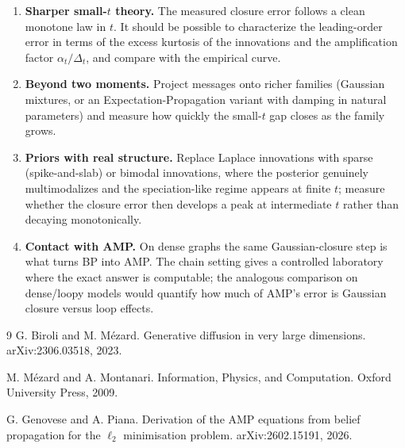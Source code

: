 \documentclass[11pt]{article}
\begin{document}
\begin{enumerate}
  \item \textbf{Sharper small-$t$ theory.} The measured closure error follows a clean
  monotone law in $t$. It should be possible to characterize the leading-order error in
  terms of the excess kurtosis of the innovations and the amplification factor
  $\alpha_t/\Delta_t$, and compare with the empirical curve.
  \item \textbf{Beyond two moments.} Project messages onto richer families
  (Gaussian mixtures, or an Expectation-Propagation variant with damping in natural
  parameters) and measure how quickly the small-$t$ gap closes as the family grows.
  \item \textbf{Priors with real structure.} Replace Laplace innovations with sparse
  (spike-and-slab) or bimodal innovations, where the posterior genuinely multimodalizes
  and the speciation-like regime appears at finite $t$; measure whether the closure error
  then develops a peak at intermediate $t$ rather than decaying monotonically.
  \item \textbf{Contact with AMP.} On dense graphs the same Gaussian-closure step is what
  turns BP into AMP. The chain setting gives a controlled laboratory where the exact
  answer is computable; the analogous comparison on dense/loopy models would quantify how
  much of AMP's error is Gaussian closure versus loop effects.
\end{enumerate}

\begin{thebibliography}{9}
G. Biroli and M. M\'ezard.
\newblock Generative diffusion in very large dimensions.
\newblock arXiv:2306.03518, 2023.

M. M\'ezard and A. Montanari.
\newblock Information, Physics, and Computation.
\newblock Oxford University Press, 2009.

G. Genovese and A. Piana.
\newblock Derivation of the AMP equations from belief propagation for the $\ell_2$ minimisation problem.
\newblock arXiv:2602.15191, 2026.
\end{thebibliography}
\end{document}

